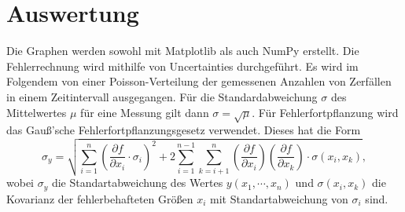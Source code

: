 \section{Auswertung}
\label{sec:Auswertung}


Die Graphen werden sowohl mit Matplotlib \cite{matplotlib} als auch NumPy \cite{numpy} erstellt. Die
Fehlerrechnung wird mithilfe von Uncertainties \cite{uncertainties} durchgeführt. Es wird im Folgendem
von einer Poisson-Verteilung der gemessenen Anzahlen von Zerfällen in einem Zeitintervall ausgegangen. Für die Standardabweichung $\sigma$ des Mittelwertes $\mu$ für eine Messung gilt dann $\sigma=\sqrt{\mu}$. Für Fehlerfortpflanzung wird das Gauß'sche Fehlerfortpflanzungsgesetz verwendet. Dieses hat die Form
\begin{equation}
	\sigma_y=\sqrt{\sum\limits_{i=1}^{n}\left(\frac{\partial f}{\partial x_i} \cdot \sigma_i\right)^2+2 \sum\limits_{i=1}^{n-1} \sum\limits_{k=i+1}^n\left(\frac{\partial f}{\partial x_i}\right) \left(\frac{\partial f}{\partial x_k}\right) \cdot \sigma(x_i,x_k)} \label{Gauss},
\end{equation}
wobei $\sigma_y$ die Standartabweichung des Wertes $y(x_1,\cdots, x_n)$ und $\sigma(x_i,x_k)$ die Kovarianz der fehlerbehafteten Größen $x_i$  mit Standartabweichung von $\sigma_i$ sind.


